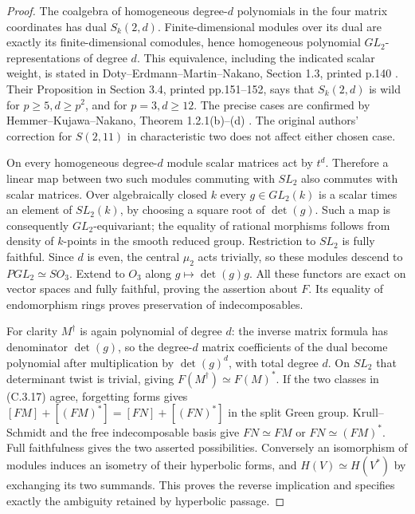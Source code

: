 \begin{proof}
The coalgebra of homogeneous degree-$d$ polynomials in the four matrix
coordinates has dual $S_k(2,d)$. Finite-dimensional modules over its
dual are exactly its finite-dimensional comodules, hence homogeneous
polynomial $GL_2$-representations of degree $d$. This equivalence,
including the indicated scalar weight, is stated in
Doty--Erdmann--Martin--Nakano, Section 1.3, printed p.140
\cite{C-DotyErdmannMartinNakano1999}.
Their Proposition in Section 3.4, printed pp.151--152, says that
$S_k(2,d)$ is wild for $p\geq5,d\geq p^2$, and for $p=3,d\geq12$.
The precise cases are confirmed by
Hemmer--Kujawa--Nakano, Theorem 1.2.1(b)--(d)
\cite{C-HemmerKujawaNakano2006}. The original authors' correction for
$S(2,11)$ in characteristic two does not affect either chosen case.

On every homogeneous degree-$d$ module scalar matrices act by $t^d$.
Therefore a linear map between two such modules commuting with $SL_2$
also commutes with scalar matrices. Over algebraically closed $k$ every
$g\in GL_2(k)$ is a scalar times an element of $SL_2(k)$, by choosing
a square root of $\det(g)$. Such a map is consequently $GL_2$-equivariant;
the equality of rational morphisms follows from density of $k$-points
in the smooth reduced group. Restriction to $SL_2$ is fully faithful.
Since $d$ is even, the central $\mu_2$ acts trivially, so these modules
descend to $PGL_2\simeq SO_3$. Extend to $O_3$ along
$g\mapsto\det(g)g$. All these functors are exact on vector spaces and
fully faithful, proving the assertion about $F$. Its equality of
endomorphism rings proves preservation of indecomposables.

For clarity $M^\dagger$ is again polynomial of degree $d$:
the inverse matrix formula has denominator $\det(g)$, so the degree-$d$
matrix coefficients of the dual become polynomial after multiplication
by $\det(g)^d$, with total degree $d$. On $SL_2$ that determinant
twist is trivial, giving $F(M^\dagger)\simeq F(M)^*$.
If the two classes in (C.3.17) agree, forgetting forms gives
$[FM]+[(FM)^*]=[FN]+[(FN)^*]$ in the split Green group.
Krull--Schmidt and the free indecomposable basis give
$FN\simeq FM$ or $FN\simeq(FM)^*$. Full faithfulness gives the two
asserted possibilities. Conversely an isomorphism of modules induces
an isometry of their hyperbolic forms, and $H(V)\simeq H(V^*)$ by
exchanging its two summands. This proves the reverse implication and
specifies exactly the ambiguity retained by hyperbolic passage.
\end{proof}
